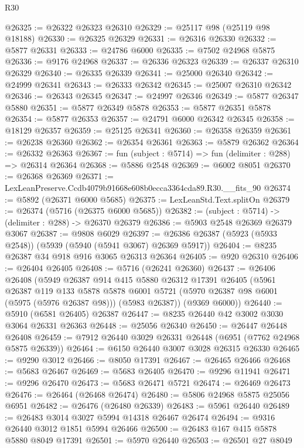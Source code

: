 \begin{lexlean}{R30}
\begin{coremodule}
@26325 := @26322 @26323 @26310
@26329 := @25117 @98 (@25119 @98 @18188)
@26330 := @26325 @26329
@26331 := @26316 @26330
@26332 := @5877 @26331
@26333 := @24786 @6000
@26335 := @7502 @24968 @5875
@26336 := @9176 @24968
@26337 := @26336 @26323
@26339 := @26337 @26310 @26329
@26340 := @26335 @26339
@26341 := @25000 @26340
@26342 := @24999 @26341
@26343 := @26333 @26342
@26345 := @25007 @26310 @26342
@26346 := @26343 @26345
@26347 := @24997 @26346
@26349 := @5877 @26347 @5880
@26351 := @5877 @26349 @5878
@26353 := @5877 @26351 @5878
@26354 := @5877 @26353
@26357 := @24791 @6000 @26342 @26345
@26358 := @18129 @26357
@26359 := @25125 @26341
@26360 := @26358 @26359
@26361 := @26238 @26360
@26362 := @26354 @26361
@26363 := @5879 @26362
@26364 := @26332 @26363
@26367 := fun (subject : @5714) => fun (delimiter : @288) => @26314 @26364
@26368 := @5886 @2548
@26369 := @6002 @8051
@26370 := @26368 @26369
@26371 := LexLeanPreserve.Ccdb4079b91668e608b0ecca3364cda89.R30.__fits_90
@26374 := @5892 (@26371 @6000 @5685)
@26375 := LexLeanStd.Text.splitOn
@26379 := @26374 (@5716 (@26375 @6000 @5685))
@26382 := (subject : @5714) -> (delimiter : @288) -> @26370 @26379
@26386 := @5903 @2548 @26369 @26379 @3067
@26387 := @9808 @6029
@26397 := @26386 @26387 (@5923 (@5933 @2548)) (@5939 (@5940 (@5941 @3067) @26369 @5917))
@26404 := @8235 @26387 @34 @918 @916 @3065 @26313 @26364
@26405 := @920 @26310
@26406 := @26404 @26405
@26408 := @5716 (@26241 @26360)
@26437 := @26406
    @26408
    (@5949
      @26387
      @914
      @415
      @5880
      @26312
      @17391
      @26405
      (@5961
        @26387
        @119
        @133
        @5878
        @5878
        @6001
        @5721
        (@5970 @26387 @98 @6001 (@5975 (@5976 @26387 @98)))
        (@5983 @26387))
      (@9369 @6000))
@26440 := @5910 (@6581 @26405) @26387
@26447 := @8235 @26440 @42 @3002 @3030 @3064 @26331 @26363
@26448 := @25056 @26340
@26450 := @26447 @26448 @26408
@26459 := @7912 @26440 @3029 @26331 @26448 (@6951 (@7762 @24968 @5875 @26339))
@26464 := @6150 @26440 @3007 @3028 @26315 @26330
@26465 := @9290 @3012
@26466 := @8050 @17391
@26467 := @26465 @26466
@26468 := @5683 @26467
@26469 := @5683 @26405
@26470 := @9296 @11941
@26471 := @9296 @26470
@26473 := @5683 @26471 @5721
@26474 := @26469 @26473
@26476 := @26464 (@26468 @26474)
@26480 := @5806 @24968 @5875 @25056 @6951
@26482 := @26476 (@26480 @26339)
@26483 := @5961 @26440
@26489 := @26483 @3014 @3027 @5994 @14318 @26467 @26474
@26494 := @9316 @26440 @3012 @1851 @5994 @26466
@26500 := @26483 @167 @415 @5878 @5880 @8049 @17391
@26501 := @5970 @26440
@26503 := @26501 @27 @8049

\end{coremodule}
\end{lexlean}
